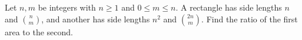 Let $n,m$ be integers with $n\ge1$ and $0\le m\le n$. A rectangle has side lengths $n$ and $\binom nm$, and another has side lengths $n^2$ and $\binom{2n}{m}$. Find the ratio of the first area to the second.
